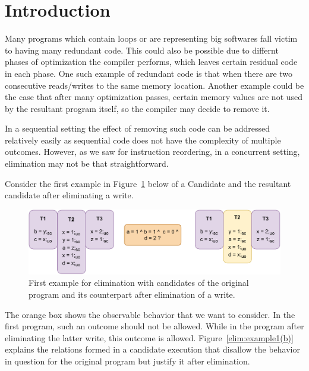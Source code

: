 \section{Introduction}

    Many programs which contain loops or are representing big softwares fall victim to having many redundant code. 
    This could also be possible due to differnt phases of optimization the compiler performs, which leaves certain residual code in each phase.
    One such example of redundant code is that when there are two consecutive reads/writes to the same memory location.
    Another example could be the case that after many optimization passes, certain memory values are not used by the resultant program itself, so the compiler may decide to remove it.
    

    In a sequential setting the effect of removing such code can be addressed relatively easily as sequential code does not have the complexity of multiple outcomes.
    However, as we saw for instruction reordering, in a concurrent setting, elimination may not be that straightforward. 
    
    Consider the first example in Figure~\ref{elim:example1(a)} below of a Candidate and the resultant candidate after eliminating a write.
    \begin{figure}[H]
        \centering
        \includegraphics[scale=0.7]{6.Elimination/EliminationExample1(a).pdf}
        \caption{First example for elimination with candidates of the original program and its counterpart after elimination of a write.} 
        \label{elim:example1(a)}
    \end{figure}

    The orange box shows the observable behavior that we want to consider. 
    In the first program, such an outcome should not be allowed. 
    While in the program after eliminating the latter write, this outcome is allowed.
    Figure~\ref{elim:example1(b)} explains the relations formed in a candidate execution that disallow the behavior in question for the original program but justify it after elimination. 
    
